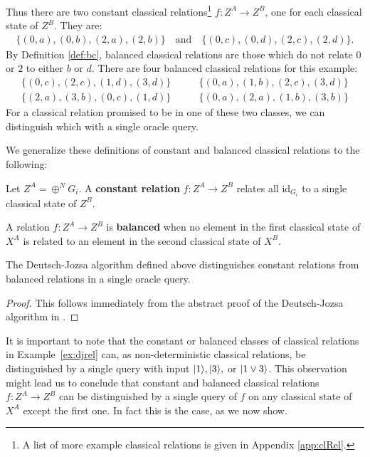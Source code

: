 \begin{example}
Thus there are two constant classical relations\footnote{A list of more example classical relations is given in Appendix \ref{app:clRel}.} $f:Z^A\to Z^B$, one for each classical state of $Z^B$. They are:
\begin{align*}
\{ (0,a),(0,b) ,(2,a),(2,b) \} \quad \mbox{and} \quad
\{ (0,c),(0,d), (2,c),(2,d) \}.
\end{align*}
By Definition \ref{def:bc}, balanced classical relations are those which do not relate $0$ or $2$ to either $b$ or $d$. There are four balanced classical relations for this example:
\begin{align*}
\{(0,c),(2,c),(1,d),(3,d)\} &\qquad \{(0,a),(1,b),(2,c),(3,d)\} \\
\{(2,a),(3,b),(0,c),(1,d)\} &\qquad \{(0,a),(2,a),(1,b),(3,b)\} 
\end{align*}
For a classical relation promised to be in one of these two classes, we can distinguish which with a single oracle query.
\end{example}

We generalize these definitions of constant and balanced classical relations to the following:
\begin{defn}
\label{def:const}
Let $Z^A=\oplus^NG_i$. A \textbf{constant relation} $f:Z^{A}\to Z^{B}$ relates all id$_{G_i}$ to a single classical state of $Z^B$.
\end{defn}

\begin{defn}
\label{def:balanced}
A relation $f:Z^{A}\to Z^{B}$ is \textbf{balanced} when no element in the first classical state of $X^{A}$ is related to an element in the second classical state of $X^{B}$.
\end{defn}

\begin{theorem}
\label{thm:dj_speedup}
The Deutsch-Jozsa algorithm defined above distinguishes constant relations from balanced relations in a single oracle query.
\end{theorem}
\begin{proof}
This follows immediately from the abstract proof of the Deutsch-Jozsa algorithm in \cite{vicary-tqa}.
\end{proof}

\begin{remark}
It is important to note that the constant or balanced classes of classical relations in Example~\ref{ex:djrel} can, as non-deterministic classical relations, be distinguished by a single query with input $| 1 \rangle,| 3 \rangle,$ or $| 1\vee 3 \rangle$.  This observation might lead us to conclude that constant and balanced classical relations $f:Z^A\to Z^B$ can be distinguished by a single query of $f$ on any classical state of $X^A$ except the first one. In fact this is the case, as we now show.
\end{remark}

